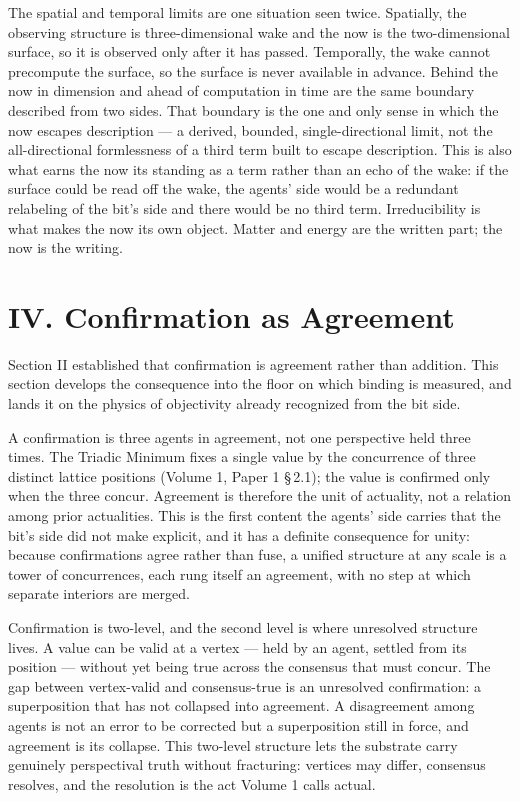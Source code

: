 \documentclass[11pt,oneside]{report}
\theoremstyle{definition}
\theoremstyle{remark}
\begin{document}
The spatial and temporal limits are one situation seen twice. Spatially,
the observing structure is three-dimensional wake and the now is the
two-dimensional surface, so it is observed only after it has passed.
Temporally, the wake cannot precompute the surface, so the surface is
never available in advance. Behind the now in dimension and ahead of
computation in time are the same boundary described from two sides. That
boundary is the one and only sense in which the now escapes description
--- a derived, bounded, single-directional limit, not the
all-directional formlessness of a third term built to escape
description. This is also what earns the now its standing as a term
rather than an echo of the wake: if the surface could be read off the
wake, the agents' side would be a redundant relabeling of the bit's side
and there would be no third term. Irreducibility is what makes the now
its own object. Matter and energy are the written part; the now is the
writing.

\section*{IV. Confirmation as Agreement}

Section II established that confirmation is agreement rather than
addition. This section develops the consequence into the floor on which
binding is measured, and lands it on the physics of objectivity already
recognized from the bit side.

A confirmation is three agents in agreement, not one perspective held
three times. The Triadic Minimum fixes a single value by the concurrence
of three distinct lattice positions (Volume 1, Paper 1 \S\,2.1); the
value is confirmed only when the three concur. Agreement is therefore the
unit of actuality, not a relation among prior actualities. This is the
first content the agents' side carries that the bit's side did not make
explicit, and it has a definite consequence for unity: because
confirmations agree rather than fuse, a unified structure at any scale is
a tower of concurrences, each rung itself an agreement, with no step at
which separate interiors are merged.

Confirmation is two-level, and the second level is where unresolved
structure lives. A value can be valid at a vertex --- held by an agent,
settled from its position --- without yet being true across the consensus
that must concur. The gap between vertex-valid and consensus-true is an
unresolved confirmation: a superposition that has not collapsed into
agreement. A disagreement among agents is not an error to be corrected
but a superposition still in force, and agreement is its collapse. This
two-level structure lets the substrate carry genuinely perspectival truth
without fracturing: vertices may differ, consensus resolves, and the
resolution is the act Volume 1 calls actual.
\end{document}
